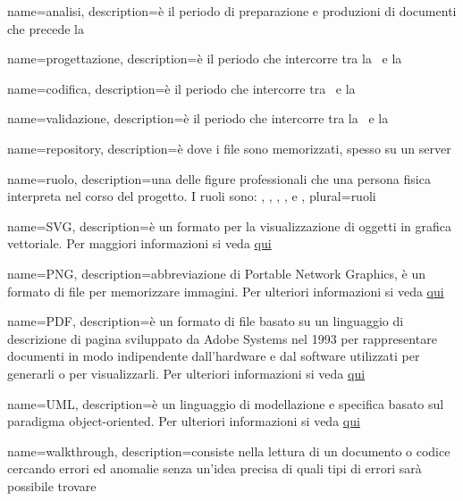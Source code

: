  {
	name=analisi,
	description={è il periodo di preparazione e produzioni di documenti che precede la \RR}
}

 {
	name=progettazione,
	description={è il periodo che intercorre tra la \RR\ e la \RP}
}

 {
	name=codifica,
	description={è il periodo che intercorre tra \RP\ e la \RQ}
}

 {
	name=validazione,
	description={è il periodo che intercorre tra la \RQ\ e la \RA}
}

 {
	name=repository,
	description={è dove i file sono memorizzati, spesso su un server}
}

 {
	name=ruolo,
	description={una delle figure professionali che una persona fisica interpreta nel corso del progetto. I ruoli sono: , , , ,  e },
    plural=ruoli
}

 {
	name=SVG,
	description={è un formato per la visualizzazione di oggetti in grafica vettoriale. Per maggiori informazioni si veda \href{https://it.wikipedia.org/wiki/Scalable_Vector_Graphics}{qui}}
}

 {
	name=PNG,
	description={abbreviazione di Portable Network Graphics, è un formato di file per memorizzare immagini. Per ulteriori informazioni si veda \href{http://it.wikipedia.org/wiki/Portable_Network_Graphics}{qui}}
}

 {
	name=PDF,
	description={è un formato di file basato su un linguaggio di descrizione di pagina sviluppato da Adobe Systems nel 1993 per rappresentare documenti in modo indipendente dall’hardware e dal software utilizzati per generarli o per visualizzarli. Per ulteriori informazioni si veda \href{http://it.wikipedia.org/wiki/Portable_Document_Format}{qui}}
}

 {
	name=UML,
	description={è un linguaggio di modellazione e specifica basato sul paradigma object-oriented. Per ulteriori informazioni si veda \href{http://it.wikipedia.org/wiki/Unified_Modeling_Language}{qui}}
}

 {
	name=walkthrough,
    description={consiste nella lettura di un documento o codice cercando errori ed anomalie senza un'idea precisa di quali tipi di errori sarà possibile trovare}
}


